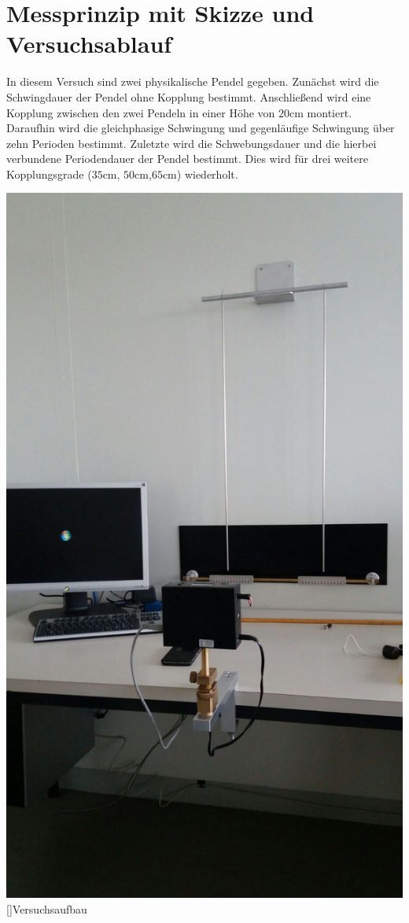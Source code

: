 \documentclass[12pt,a4paper,]{scrreprt}
\begin{document}
\chapter{Messprinzip mit Skizze und Versuchsablauf}
In diesem Versuch sind zwei physikalische Pendel gegeben. Zunächst wird die Schwingdauer der Pendel ohne Kopplung bestimmt. Anschließend wird eine Kopplung zwischen den zwei Pendeln in einer Höhe von $20\si{\centi\metre}$ montiert. Daraufhin wird die gleichphasige Schwingung und gegenläufige Schwingung über zehn Perioden bestimmt.
Zuletzte wird die Schwebungsdauer und die hierbei verbundene Periodendauer der Pendel bestimmt.
Dies wird für drei weitere Kopplungsgrade ($35\si{\centi\metre}$, $50\si{\centi\metre}$,$65\si{\centi\metre}$) wiederholt.
\begin{center}

\includegraphics[scale=0.25]{2.jpg}
[]{Versuchsaufbau}
\end{center}
\end{document}
